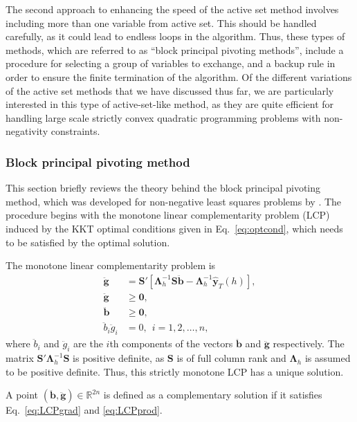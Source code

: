 \documentclass[11pt]{article}
\newcommand{\0}{\phantom{0}}
\begin{document}
The second approach to enhancing the speed of the active set method involves including more than one variable from active set. This should be handled carefully, as it could lead to endless loops in the algorithm. Thus, these types of methods, which are referred to  as ``block principal pivoting methods'', include a procedure for selecting a group of variables to exchange, and a backup rule in order to ensure the finite termination of the algorithm. Of the different variations of the active set methods that we have discussed thus far, we are particularly interested in this type of active-set-like method, as they are quite efficient for handling large scale strictly convex quadratic programming problems with non-negativity constraints. 

\subsubsection{Block principal pivoting method}

This section briefly reviews the theory behind the block principal pivoting method, which was developed for non-negative least squares problems by \citet{Judice1994}. The procedure begins with the monotone linear complementarity problem (LCP) induced by the KKT optimal conditions given in Eq.\ \eqref{eq:optcond}, which needs to be satisfied by the optimal solution.

The monotone linear complementarity problem is
\begin{align}
\ddot{\bm{g}} & = \bm{S}'[\bm{\Lambda}_{h}^{-1}\bm{S}\ddot{\bm{b}} - \bm{\Lambda}_{h}^{-1}\hat{\bm{y}}_{T}(h)],\label{eq:LCPgrad}\\
\ddot{\bm{g}} & \geq \bm{0}, \label{eq:LCPg}\\
\ddot{\bm{b}} & \geq \bm{0}, \label{eq:LCPb}\\
\ddot{b}_{i}\ddot{g}_{i} & = 0, \ \ i = 1, 2, \dots, n\label{eq:LCPprod},
\end{align}
where $\ddot{b}_{i}$ and $\ddot{g}_{i}$ are the $i$th components of the vectors $\ddot{\bm{b}}$ and $\ddot{\bm{g}}$ respectively. The matrix $\bm{S}'\bm{\Lambda}_{h}^{-1}\bm{S}$ is positive definite, as $\bm{S}$ is of full column rank and $\bm{\Lambda}_{h}$ is assumed to be positive definite. Thus, this strictly monotone LCP has a unique solution.

A point $(\ddot{\bm{b}}, \ddot{\bm{g}}) \in \mathbb{R}^{2n}$ is defined as a complementary solution if it satisfies Eq.\ \eqref{eq:LCPgrad} and \eqref{eq:LCPprod}.
\end{document}
